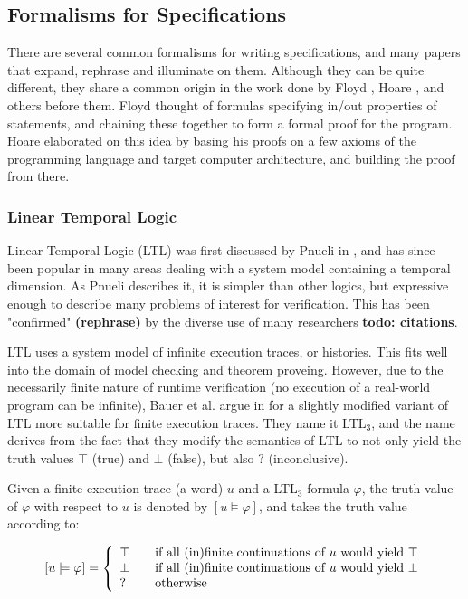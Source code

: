 \documentclass[a4paper,11pt]{kth-mag}
\newcommand{\todo}[1]{\textbf{todo: #1}}
\newcommand{\rephrase}{\textbf{(rephrase)} }
\begin{document}
\subsection{Formalisms for Specifications}

There are several common formalisms for writing specifications, and many papers that expand,
rephrase and illuminate on them. Although they can be quite different, they share a
common origin in the work done by Floyd \cite{floyd67}, Hoare \cite{hoare69}, and others before them.
Floyd thought of formulas specifying in/out properties of statements, and chaining these together
to form a formal proof for the program. Hoare elaborated on this idea by basing his proofs on
a few axioms of the programming language and target computer architecture, and building the proof from there.

\subsubsection{Linear Temporal Logic}

Linear Temporal Logic (LTL) was first discussed by Pnueli in \cite{pnueli77}, and has since been
popular in many areas dealing with a system model containing a temporal dimension. As Pnueli
describes it, it is simpler than other logics, but expressive enough to describe many problems
of interest for verification. This has been "confirmed" \rephrase by the diverse use of
many researchers \todo{citations}.

LTL uses a system model of infinite execution traces, or histories. This fits well into the domain
of model checking and theorem proveing. However, due to the necessarily finite nature of runtime
verification (no execution of a real-world program can be infinite), Bauer et al. argue in
\cite{bauer07rvltl,bauer06monitoring} for a slightly modified variant of LTL more suitable
for finite execution traces. They name it LTL$_3$, and the name derives from the fact that they
modify the semantics of LTL to not only yield the truth values $\top$ (true) and $\bot$ (false), but also $?$ (inconclusive).

Given a finite execution trace (a word) $u$ and a LTL$_3$ formula $\varphi$, the truth value of $\varphi$ with respect to $u$ is denoted by $[u \models \varphi]$, and takes the truth value according to:

\[
  [u \models \varphi] = \left\{
  \begin{array}{l l}
    \top & \quad \text{if all (in)finite continuations of $u$ would yield $\top$} \\
    \bot & \quad \text{if all (in)finite continuations of $u$ would yield $\bot$} \\
    ?    & \quad \text{otherwise} \\
  \end{array} \right.
\] 
\end{document}
